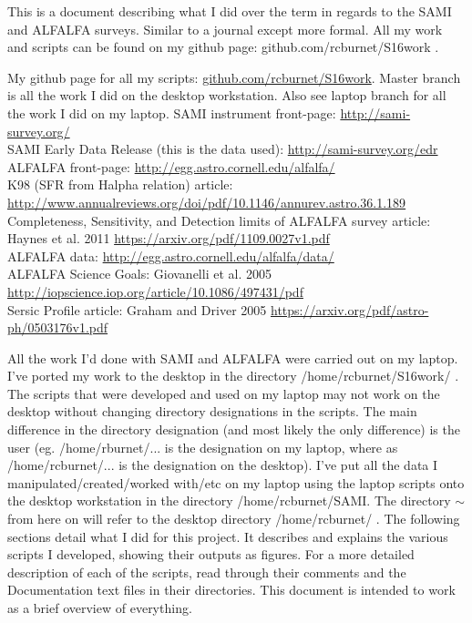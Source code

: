 \documentclass[10pt,letterpaper]{article}
\begin{document}
This is a document describing what I did over the term in regards to the SAMI and ALFALFA surveys. Similar to a journal except more formal. All my work and scripts can be found on my github page: github.com/rcburnet/S16work .
\begin{thebibliography}{1}
My github page for all my scripts: \url{github.com/rcburnet/S16work}. Master branch is all the work I did on the desktop workstation. Also see laptop branch for all the work I did on my laptop.
SAMI instrument front-page: \url{http://sami-survey.org/}\\
SAMI Early Data Release (this is the data used): \url{http://sami-survey.org/edr}\\
 ALFALFA front-page: \url{http://egg.astro.cornell.edu/alfalfa/}\\
K98 (SFR from Halpha relation) article: \url{http://www.annualreviews.org/doi/pdf/10.1146/annurev.astro.36.1.189}\\
 Completeness, Sensitivity, and Detection limits of ALFALFA survey article: Haynes et al. 2011 \url{https://arxiv.org/pdf/1109.0027v1.pdf}\\
 ALFALFA data: \url{http://egg.astro.cornell.edu/alfalfa/data/}\\
 ALFALFA Science Goals: Giovanelli et al. 2005 \url{http://iopscience.iop.org/article/10.1086/497431/pdf}\\
Sersic Profile article: Graham and Driver 2005 \url{https://arxiv.org/pdf/astro-ph/0503176v1.pdf}\\

\end{thebibliography}
All the work I'd done with SAMI and ALFALFA were carried out on my laptop. I've ported my work to the desktop in the directory /home/rcburnet/S16work/ . The scripts that were developed and used on my laptop may not work on the desktop without changing directory designations in the scripts. The main difference in the directory designation (and most likely the only difference) is the user (eg. /home/rburnet/... is the designation on my laptop, where as /home/rcburnet/... is the designation on the desktop). I've put all the data I manipulated/created/worked with/etc on my laptop using the laptop scripts onto the desktop workstation in the directory /home/rcburnet/SAMI. The directory $\sim$ from here on will refer to the desktop directory /home/rcburnet/ . The following sections detail what I did for this project. It describes and explains the various scripts I developed, showing their outputs as figures. For a more detailed description of each of the scripts, read through their comments and the Documentation text files in their directories. This document is intended to work as a brief overview of everything.\\
\end{document}
